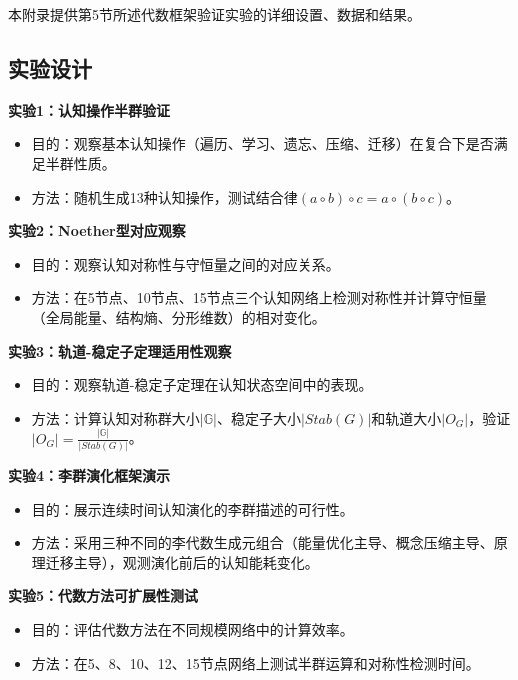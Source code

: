 \documentclass[12pt,a4paper]{article}
\newcommand{\cognitivegroup}{\mathbb{G}}
\begin{document}
本附录提供第5节所述代数框架验证实验的详细设置、数据和结果。

\subsection{实验设计}

\textbf{实验1：认知操作半群验证}
\begin{itemize}
    \item 目的：观察基本认知操作（遍历、学习、遗忘、压缩、迁移）在复合下是否满足半群性质。
    \item 方法：随机生成13种认知操作，测试结合律$(a \circ b) \circ c = a \circ (b \circ c)$。
\end{itemize}

\textbf{实验2：Noether型对应观察}
\begin{itemize}
    \item 目的：观察认知对称性与守恒量之间的对应关系。
    \item 方法：在5节点、10节点、15节点三个认知网络上检测对称性并计算守恒量（全局能量、结构熵、分形维数）的相对变化。
\end{itemize}

\textbf{实验3：轨道-稳定子定理适用性观察}
\begin{itemize}
    \item 目的：观察轨道-稳定子定理在认知状态空间中的表现。
    \item 方法：计算认知对称群大小$|\cognitivegroup|$、稳定子大小$|Stab(G)|$和轨道大小$|O_G|$，验证$|O_G| = \frac{|\cognitivegroup|}{|Stab(G)|}$。
\end{itemize}

\textbf{实验4：李群演化框架演示}
\begin{itemize}
    \item 目的：展示连续时间认知演化的李群描述的可行性。
    \item 方法：采用三种不同的李代数生成元组合（能量优化主导、概念压缩主导、原理迁移主导），观测演化前后的认知能耗变化。
\end{itemize}

\textbf{实验5：代数方法可扩展性测试}
\begin{itemize}
    \item 目的：评估代数方法在不同规模网络中的计算效率。
    \item 方法：在5、8、10、12、15节点网络上测试半群运算和对称性检测时间。
\end{itemize}

\end{document}
